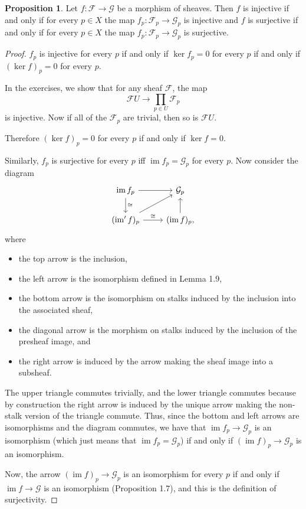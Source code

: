 \documentclass[a4paper]{amsbook}
\theoremstyle{definition}
\newtheorem*{proposition*}{Proposition}
\DeclareMathOperator\im{im}
\begin{document}
\begin{proposition*}
\label{InjectivityOnStalks}
Let $f\colon \mathcal{F}\to \mathcal{G}$ be a morphism of sheaves. Then
$f$ is injective if and only if for every $p \in X$ the map $f_p\colon \mathcal{F}_p \to \mathcal{G}_p$ is injective
and $f$ is surjective if and only if for every $p \in X$ the map $f_p\colon \mathcal{F}_p\to \mathcal{G}_p$ is surjective.
\end{proposition*}
\begin{proof}[Proof]
$f_p$ is injective for every $p$ if and only if $\ker f_p = 0$ for every $p$
if and only if $(\ker f)_p = 0$ for every $p$.

In the exercises, we show that for any sheaf $\mathcal{F}$, the map
\[ \mathcal{F}U \to \prod_{p \in U} \mathcal{F}_p \]
is injective. Now if all of the $\mathcal{F}_p$ are trivial, then so is
$\mathcal{F}U$.

Therefore $(\ker f)_p = 0$ for every $p$ if and only if $\ker f = 0$.

Similarly, $f_p$ is surjective for every $p$ iff $\im f_p = \mathcal{G}_p$ for every $p$.
Now consider the diagram
\[\begin{tikzcd}
	\im f_p\ar[r]\ar[d, "\cong"] & \mathcal{G}_p\\
	(\im' f)_p\ar[ur]\ar[r, "\cong"] & (\im f)_p,\ar[u]
\end{tikzcd}\]
where
\begin{itemize}
	\item the top arrow is the inclusion,
	\item the left arrow is the isomorphism defined in Lemma 1.9,
	\item the bottom arrow is the isomorphism on stalks induced by the inclusion into
		the associated sheaf,
	\item the diagonal arrow is the morphism on stalks induced by the inclusion of
		the presheaf image, and
	\item the right arrow is induced by the arrow making the sheaf image into a
		subsheaf.
\end{itemize}

The upper triangle commutes trivially, and the lower triangle commutes because
by construction the right arrow is induced by the unique arrow making the non-stalk
version of the triangle commute.
Thus, since the bottom and left arrows are isomorphisms and the diagram commutes,
we have that $\im f_p \to \mathcal{G}_p$ is an isomorphism (which just means that
$\im f_p = \mathcal{G}_p$) if and only if
$(\im f)_p \to \mathcal{G}_p$ is an isomorphism.

Now, the arrow $(\im f)_p \to \mathcal{G}_p$ is an isomorphism for every $p$ if
and only if $\im f \to \mathcal{G}$ is an isomorphism (Proposition 1.7), and this
is the definition of surjectivity.
\end{proof}
\end{document}

